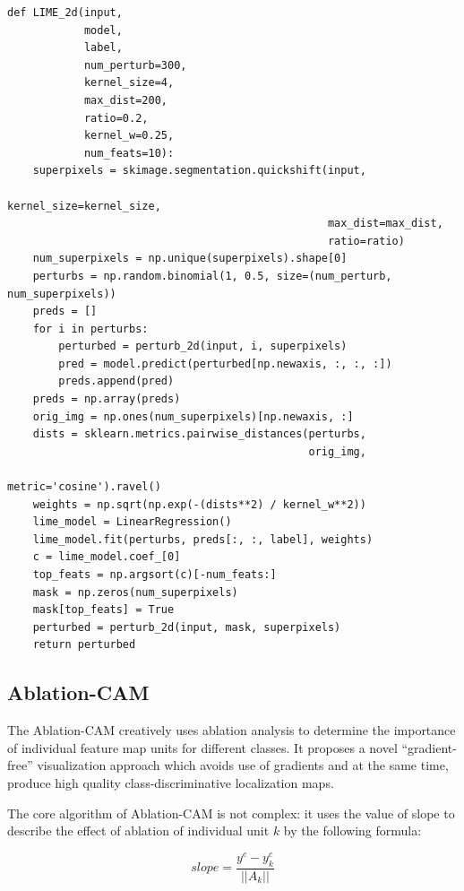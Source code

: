 \documentclass[conference]{IEEEtran}
\begin{document}
\begin{lstlisting}
def LIME_2d(input,
            model,
            label,
            num_perturb=300,
            kernel_size=4,
            max_dist=200,
            ratio=0.2,
            kernel_w=0.25,
            num_feats=10):
    superpixels = skimage.segmentation.quickshift(input,
                                                  kernel_size=kernel_size,
                                                  max_dist=max_dist,
                                                  ratio=ratio)
    num_superpixels = np.unique(superpixels).shape[0]
    perturbs = np.random.binomial(1, 0.5, size=(num_perturb, num_superpixels))
    preds = []
    for i in perturbs:
        perturbed = perturb_2d(input, i, superpixels)
        pred = model.predict(perturbed[np.newaxis, :, :, :])
        preds.append(pred)
    preds = np.array(preds)
    orig_img = np.ones(num_superpixels)[np.newaxis, :]
    dists = sklearn.metrics.pairwise_distances(perturbs,
                                               orig_img,
                                               metric='cosine').ravel()
    weights = np.sqrt(np.exp(-(dists**2) / kernel_w**2))
    lime_model = LinearRegression()
    lime_model.fit(perturbs, preds[:, :, label], weights)
    c = lime_model.coef_[0]
    top_feats = np.argsort(c)[-num_feats:]
    mask = np.zeros(num_superpixels)
    mask[top_feats] = True
    perturbed = perturb_2d(input, mask, superpixels)
    return perturbed
\end{lstlisting}

\subsection{Ablation-CAM}

The Ablation-CAM creatively uses ablation analysis to determine the importance of individual feature map units for different classes. It proposes a novel “gradient-free” visualization approach which avoids use of gradients and at the same time, produce high quality class-discriminative localization maps.\par

The core algorithm of Ablation-CAM is not complex: it uses the value of slope to describe the effect of ablation of individual unit $k$ by the following formula:

$$slope = \frac{y^c-y^c_k}{||A_k||}$$
\end{document}
